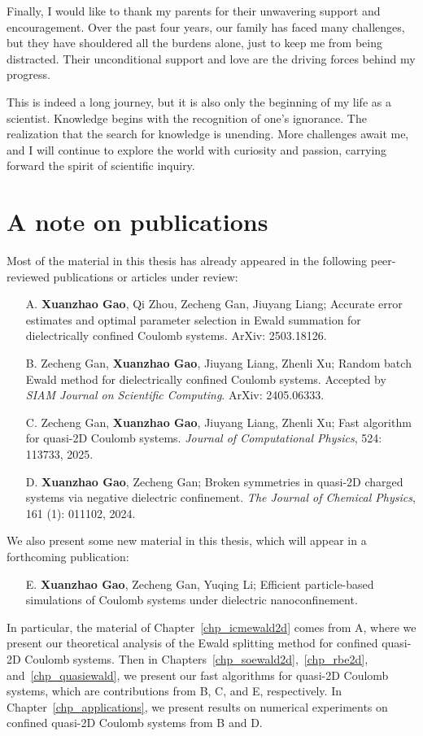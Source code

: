 Finally, I would like to thank my parents for their unwavering support and encouragement.
Over the past four years, our family has faced many challenges, but they have shouldered all the burdens alone, just to keep me from being distracted.
Their unconditional support and love are the driving forces behind my progress.

This is indeed a long journey, but it is also only the beginning of my life as a scientist.
Knowledge begins with the recognition of one's ignorance. 
The realization that the search for knowledge is unending.
More challenges await me, and I will continue to explore the world with curiosity and passion, carrying forward the spirit of scientific inquiry.

\section*{A note on publications}

Most of the material in this thesis has already appeared in the following peer-reviewed publications or articles under review:
\begin{itemize}
    \item[A.] \textbf{Xuanzhao Gao}, Qi Zhou, Zecheng Gan, Jiuyang Liang; Accurate error estimates and optimal parameter selection in Ewald summation for dielectrically confined Coulomb systems. ArXiv: 2503.18126.
    \item[B.] Zecheng Gan, \textbf{Xuanzhao Gao}, Jiuyang Liang, Zhenli Xu; Random batch Ewald method for dielectrically confined Coulomb systems. Accepted by \emph{SIAM Journal on Scientific Computing}. ArXiv: 2405.06333.
    \item[C.] Zecheng Gan, \textbf{Xuanzhao Gao}, Jiuyang Liang, Zhenli Xu; Fast algorithm for quasi-2D Coulomb systems. \emph{Journal of Computational Physics}, 524: 113733, 2025.
    \item[D.] \textbf{Xuanzhao Gao}, Zecheng Gan; Broken symmetries in quasi-2D charged systems via negative dielectric confinement. \emph{The Journal of Chemical Physics}, 161 (1): 011102, 2024.
\end{itemize}
We also present some new material in this thesis, which will appear in a forthcoming publication:
\begin{itemize}
    \item[E.] \textbf{Xuanzhao Gao}, Zecheng Gan, Yuqing Li; Efficient particle-based simulations of Coulomb systems under dielectric nanoconfinement.
\end{itemize}
In particular, the material of Chapter~\ref{chp_icmewald2d} comes from A, where we present our theoretical analysis of the Ewald splitting method for confined quasi-2D Coulomb systems.
Then in Chapters~\ref{chp_soewald2d},~\ref{chp_rbe2d}, and~\ref{chp_quasiewald}, we present our fast algorithms for quasi-2D Coulomb systems, which are contributions from B, C, and E, respectively.
In Chapter~\ref{chp_applications}, we present results on numerical experiments on confined quasi-2D Coulomb systems from B and D.